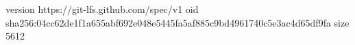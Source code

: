version https://git-lfs.github.com/spec/v1
oid sha256:04cc62de1f1a655abf692e048e5445fa5af885c9bd4961740c5e3ac4d65df9fa
size 5612
